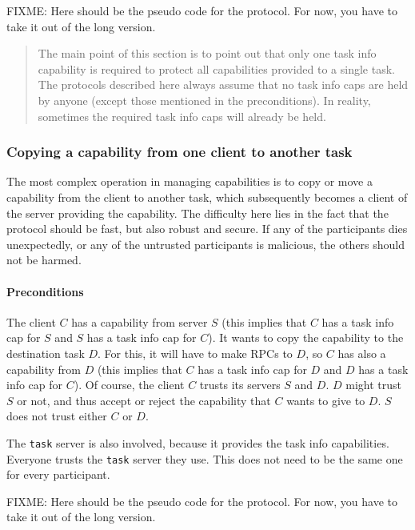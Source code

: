 \documentclass[9pt,a4paper]{extarticle}
\newenvironment{comment}{\footnotesize \begin{quote}}{\end{quote}}
\begin{document}
FIXME: Here should be the pseudo code for the protocol.  For now, you
have to take it out of the long version.

\begin{comment}
  The main point of this section is to point out that only one task
  info capability is required to protect all capabilities provided to
  a single task.  The protocols described here always assume that no
  task info caps are held by anyone (except those mentioned in the
  preconditions).  In reality, sometimes the required task info caps
  will already be held.
\end{comment}


\subsubsection{Copying a capability from one client to another task}

The most complex operation in managing capabilities is to copy or move
a capability from the client to another task, which subsequently
becomes a client of the server providing the capability.  The
difficulty here lies in the fact that the protocol should be fast, but
also robust and secure.  If any of the participants dies unexpectedly,
or any of the untrusted participants is malicious, the others should
not be harmed.

\paragraph{Preconditions}
The client $C$ has a capability from server $S$ (this implies that $C$
has a task info cap for $S$ and $S$ has a task info cap for $C$).  It
wants to copy the capability to the destination task $D$.  For this,
it will have to make RPCs to $D$, so $C$ has also a capability from
$D$ (this implies that $C$ has a task info cap for $D$ and $D$ has a
task info cap for $C$).  Of course, the client $C$ trusts its servers
$S$ and $D$.  $D$ might trust $S$ or not, and thus accept or reject
the capability that $C$ wants to give to $D$.  $S$ does not trust
either $C$ or $D$.
  
The \texttt{task} server is also involved, because it provides the
task info capabilities.  Everyone trusts the \texttt{task} server they
use.  This does not need to be the same one for every participant.

FIXME: Here should be the pseudo code for the protocol.  For now, you
have to take it out of the long version.
\end{document}
